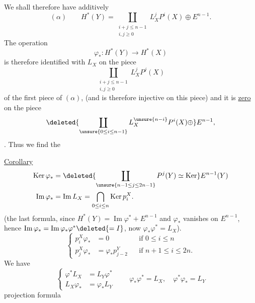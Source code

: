 We shall therefore have additively
\[
(\alpha)\qquad H^*(Y)=\coprod_{\substack{i+j\leq n-1\\i,j\geq0}}L_X^jP^i(X)\oplus E^{n-1}.
\]
The operation
\[\varphi_*:H^*(Y)\longrightarrow H^*(X)\]
is therefore identified with $L_X$ on the piece
\[\coprod_{\substack{i+j\leq n-1\\i,j\geq0}}L_X^jP^j(X)\]
of the first piece of $(\alpha)$, (and is  therefore injective on this piece) and it is \uline{zero} on the piece
\[
\deleted{\coprod_{\unsure{0\leq i\leq n-1}}L_X^{\unsure{n-i}}P^i(X)\oplus}E^{n-1},
\]
. Thus we find the

\uline{Corollary}
\[
\begin{aligned}
\operatorname{Ker}\varphi_*&=\deleted{\coprod_{\unsure{n-1\leq j\leq2n-1}}P^j(Y)\simeq\operatorname{Ker}}E^{n-1}(Y)\\
\operatorname{Im}\varphi_*&=\operatorname{Im}L_X=\bigcap_{0\leq i\leq n}\operatorname{Ker}p_i^X.
\end{aligned}
\]
(the last formula, since $H^*(Y)=\operatorname{Im}\varphi^*+E^{n-1}$ and $\varphi_*$ vanishes on $E^{n-1}$, hence $\operatorname{Im}\varphi_*=\operatorname{Im}\varphi_*\varphi^*\deleted{=I}$, now $\varphi_*\varphi^*=L_X$).
\[
\left\{\begin{aligned}
p_i^X\varphi_*&=0 &&\text{if }0\leq i\leq n\\
p_{j}^X\varphi_*&=\varphi_*p_{j-2}^Y &&\text{if }n+1\leq i\leq2n.
\end{aligned}\right.
\]
We have
\[
\left\{\begin{aligned}
\varphi^*L_X&=L_Y\varphi^*\\
L_X\varphi_*&=\varphi_*L_Y
\end{aligned}\right.
\qquad
\varphi_*\varphi^*=L_X,\quad\varphi^*\varphi_*=L_Y
\]
projection formula

